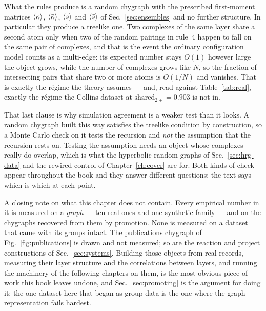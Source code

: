 What the rules produce is a random chygraph with the prescribed first-moment
matrices $\langle \kappa \rangle$, $\langle \bar\kappa \rangle$, $\langle s \rangle$ and $\langle \bar s \rangle$ of
Sec.~\ref{sec:ensembles} and no further structure. In particular they produce a
treelike one. Two complexes of the same layer share a second atom only when two
of the random pairings in rule~4 happen to fall on the same pair of complexes,
and that is the event the ordinary configuration model counts as a multi-edge:
its expected number stays $O(1)$ however large the object grows, while the number
of complexes grows like $N$, so the fraction of intersecting pairs that share two
or more atoms is $O(1/N)$ and vanishes. That is exactly the r\'egime the theory
assumes --- and, read against Table~\ref{tab:real}, exactly the r\'egime the
Collins dataset at $\mathrm{shared}_{2+}=0.903$ is not in.

That last clause is why simulation agreement is a weaker test than it looks. A random chygraph built this way
satisfies the treelike condition by construction, so a Monte Carlo check on it
tests the recursion and \emph{not} the assumption that the recursion rests on.
Testing the assumption needs an object whose complexes really do overlap, which
is what the hyperbolic random graphs of Sec.~\ref{sec:hrg-data} and the rewired
control of Chapter~\ref{ch:cover} are for. Both kinds of check appear throughout
the book and they answer different questions; the text says which is which at
each point.

\medskip

A closing note on what this chapter does not contain. Every empirical number in
it is measured on a \emph{graph} --- ten real ones and one synthetic family ---
and on the chygraphs recovered from them by promotion. None is measured on a
dataset that came with its groups intact. The publications chygraph of
Fig.~\ref{fig:publications} is drawn and not measured; so are the reaction and
project constructions of Sec.~\ref{sec:systems}. Building those objects from
real records, measuring their layer structure and the correlations between
layers, and running the machinery of the following chapters on them, is the most
obvious piece of work this book leaves undone, and Sec.~\ref{sec:promoting} is
the argument for doing it: the one dataset here that began as
group data is the one where the graph representation fails hardest.
